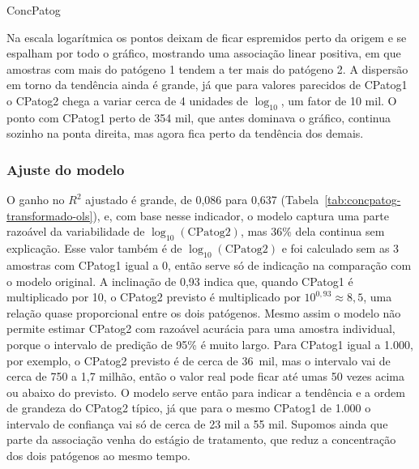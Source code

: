 \begin{dataset}{ConcPatog}

Na escala logarítmica os pontos deixam de ficar espremidos perto da origem e se espalham por todo o gráfico, mostrando uma associação linear positiva, em que amostras com mais do patógeno 1 tendem a ter mais do patógeno 2. A dispersão em torno da tendência ainda é grande, já que para valores parecidos de CPatog1 o CPatog2 chega a variar cerca de 4 unidades de $\log_{10}$, um fator de 10 mil. O ponto com CPatog1 perto de 354 mil, que antes dominava o gráfico, continua sozinho na ponta direita, mas agora fica perto da tendência dos demais.

\subsubsection{Ajuste do modelo}


O ganho no $R^2$ ajustado é grande, de 0,086 para 0,637 (Tabela~\ref{tab:concpatog-transformado-ols}), e, com base nesse indicador, o modelo captura uma parte razoável da variabilidade de $\log_{10}(\text{CPatog2})$, mas 36\% dela continua sem explicação. Esse valor também é de $\log_{10}(\text{CPatog2})$ e foi calculado sem as 3 amostras com CPatog1 igual a 0, então serve só de indicação na comparação com o modelo original. A inclinação de 0,93 indica que, quando CPatog1 é multiplicado por 10, o CPatog2 previsto é multiplicado por $10^{0{,}93} \approx 8{,}5$, uma relação quase proporcional entre os dois patógenos. Mesmo assim o modelo não permite estimar CPatog2 com razoável acurácia para uma amostra individual, porque o intervalo de predição de 95\% é muito largo. Para CPatog1 igual a 1.000, por exemplo, o CPatog2 previsto é de cerca de 36~mil, mas o intervalo vai de cerca de 750 a 1,7 milhão, então o valor real pode ficar até umas 50 vezes acima ou abaixo do previsto. O modelo serve então para indicar a tendência e a ordem de grandeza do CPatog2 típico, já que para o mesmo CPatog1 de 1.000 o intervalo de confiança vai só de cerca de 23 mil a 55 mil. Supomos ainda que parte da associação venha do estágio de tratamento, que reduz a concentração dos dois patógenos ao mesmo tempo.



\end{dataset}
